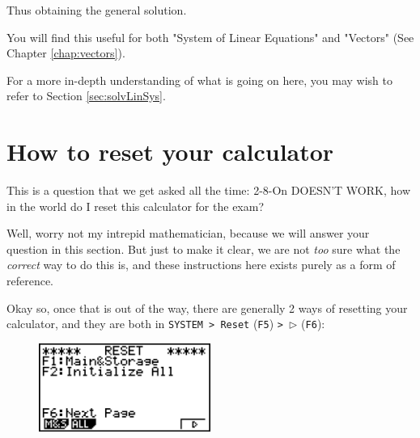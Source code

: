 \documentclass[a5paper]{memoir}
\def\code#1{\texttt{#1}}
\def\Ffive{(\code{F5}) }
\def\fsix{(\code{F6})}
\begin{document}
\begin{itemize}
	Thus obtaining the general solution. 
\end{itemize}

You will find this useful for both "System of Linear Equations" and "Vectors" (See Chapter \ref{chap:vectors}). 

For a more in-depth understanding of what is going on here, you may wish to refer to Section \ref{sec:solvLinSys}.

\section{How to reset your calculator}
This is a question that we get asked all the time: 2-8-On DOESN'T WORK, how in the world do I reset this calculator for the exam? 

Well, worry not my intrepid mathematician, because we will answer your question in this section. But just to make it clear, we are not \textit{too} sure what the \textit{correct} way to do this is, and these instructions here exists purely as a form of reference.

Okay so, once that is out of the way, there are generally 2 ways of resetting your calculator, and they are both in \code{SYSTEM > Reset} \Ffive \code{> $\triangleright$} \fsix:

\begin{figure}[h]
	\centering
	\includegraphics[width=0.5\textwidth]{resetscreen}
\end{figure}
\end{document}

